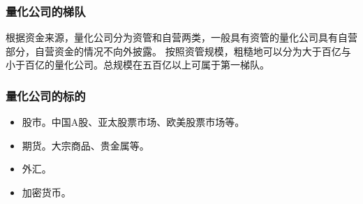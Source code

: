 \subsubsection{量化公司的梯队}
根据资金来源，量化公司分为资管和自营两类，一般具有资管的量化公司具有自营部分，自营资金的情况不向外披露。
按照资管规模，粗糙地可以分为大于百亿与小于百亿的量化公司。总规模在五百亿以上可属于第一梯队。

\subsubsection{量化公司的标的}
\begin{itemize}
    \item 股市。中国A股、亚太股票市场、欧美股票市场等。
    \item 期货。大宗商品、贵金属等。
    \item 外汇。
    \item 加密货币。
\end{itemize}
